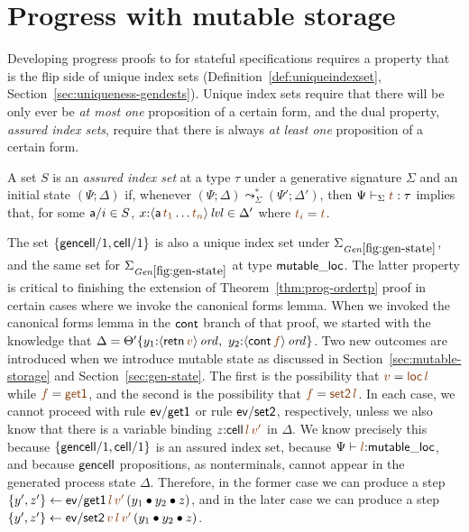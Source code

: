 \section{Progress with mutable storage}
\label{sec:progess-mutable}

Developing progress proofs to for stateful specifications requires a
property that is the flip side of unique index sets
(Definition~\ref{def:uniqueindexset},
Section~\ref{sec:uniqueness-gendests}). Unique index sets require that there
will be only ever be {\it at most one} proposition of a certain form, 
and the dual property, {\it assured index sets}, require that there is always
{\it at least one} proposition of a certain form. 

\bigskip
\begin{definition}
  A set $S$ is an {\em assured index set} at a type $\tau$ under a
  generative signature $\Sigma$ and an initial state $(\Psi; \Delta)$
  if, whenever $(\Psi; \Delta) \leadsto^*_{\Sigma} (\Psi'; \Delta')$,
  then $\Psi \vdash_\Sigma \lf{t} : \tau$ implies that, for some ${\sf
    a}/i \in S$, $x{:}\islvl{\susp{{\sf a}\,\lf{t_1}\ldots\lf{t_n}}}
  \in \Delta'$ where $\lf{t_i} = \lf{t}$. 
\end{definition}
\bigskip

The set $\{ {\sf gencell}/1, {\sf cell}/1 \}$ is also a unique index
set under $\siggenstate$, and the same set for $\siggenstate$ at type
${\sf mutable\_loc}$.  The latter property is critical to finishing
the extension of Theorem~\ref{thm:prog-ordertp} proof in certain cases
where we invoke the canonical forms lemma. When we invoked the
canonical forms lemma in the ${\sf cont}$ branch of that proof, we
started with the knowledge that $\Delta = \tackon{\Theta'}{
  y_1{:}\istrue{\susp{{\sf retn}\,\lf{v}}}, ~ y_2{:}\istrue{\susp{{\sf
        cont}\,\lf{f}}}}$. Two new outcomes are introduced when we
introduce mutable state as discussed in
Section~\ref{sec:mutable-storage} and Section~\ref{sec:gen-state}.
The first is the possibility that $\lf{v} = \lf{{\sf loc}\,l}$ while
$\lf{f} = \lf{\sf get1}$, and the second is the possibility that
$\lf{f} = \lf{{\sf set2}\,l}$. In each case, we cannot proceed with
rule ${\sf ev/get1}$ or rule ${\sf ev/set2}$, respectively, unless we
also know that there is a variable binding $z{:}{\sf
  cell}\,\lf{l}\,\lf{v'}$ in $\Delta$. We know precisely this because
$\{ {\sf gencell}/1, {\sf cell}/1 \}$ is an assured index set, because
$\Psi \vdash \lf{l} {:} {\sf mutable\_loc}$, and because ${\sf
  gencell}$ propositions, as nonterminals, cannot appear in the
generated process state $\Delta$. Therefore, in the former case we can
produce a step $\trstep{y', z'}{{\sf
    ev/get1}\,\lf{l}\,\lf{v'}\,(\tfuser{y_1}{\tfuser{y_2}{z}})}$, and
in the later case we can produce a step $\trstep{y', z'}{{\sf
    ev/set2}\,\lf{v}\,\lf{l}\,\lf{v'}\,(\tfuser{y_1}{\tfuser{y_2}{z}})}$.

